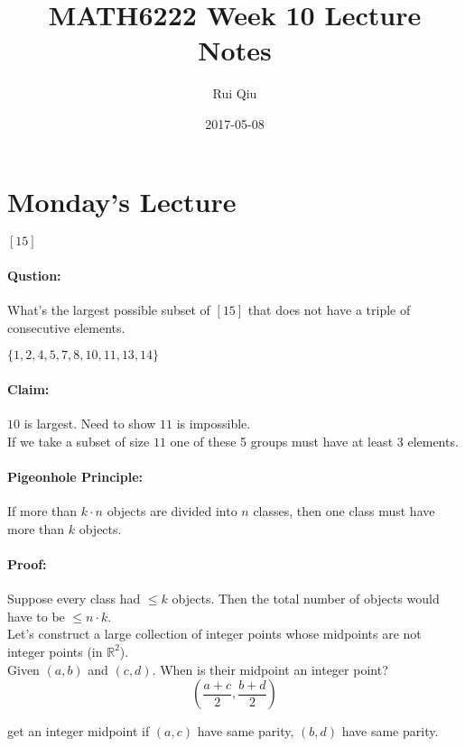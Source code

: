 \documentclass[a4paper, 11pt, twoside]{article}
\begin{document}
\title{MATH6222 Week 10 Lecture Notes}
\author{Rui Qiu}
\date{2017-05-08}

\maketitle

\section{Monday's Lecture}

$[15]$

\paragraph{Qustion:} What's the largest possible subset of $[15]$ that does not have a triple of consecutive elements.

$\{1, 2, 4, 5, 7, 8, 10, 11, 13, 14\}$

\paragraph{Claim:} $10$ is largest. Need to show $11$ is impossible.\\

If we take a subset of size $11$ one of these 5 groups must have at least $3$ elements.

\paragraph{Pigeonhole Principle:} If more than $k\cdot n$ objects are divided into $n$ classes, then one class must have more than $k$ objects.

\paragraph{Proof:} Suppose every class had $\leq k$ objects. Then the total number of objects would have to be $\leq n\cdot k$.\\

Let's construct a large collection of integer points whose midpoints are not integer points (in $\mathbb{R}^2$).\\

Given $(a,b)$ and $(c,d)$. When is their midpoint an integer point?\\

\[\left(\frac{a+c}{2}, \frac{b+d}{2}\right)\]

get an integer midpoint if $(a,c)$ have same parity, $(b,d)$ have same parity.\\
\end{document}
